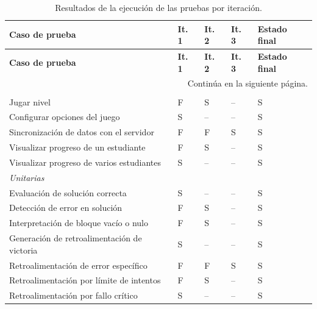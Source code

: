 \begingroup
\setlength{\tabcolsep}{4pt}
\renewcommand{\arraystretch}{1.4}
\begin{longtable}{| p{5.5cm} | >{\centering\arraybackslash}p{1cm} | >{\centering\arraybackslash}p{1cm} | >{\centering\arraybackslash}p{1cm} | >{\centering\arraybackslash}p{1.6cm} |}
	
	\caption{Resultados de la ejecución de las pruebas por iteración.}
	\label{tab:res-pruebas} \\
	
	\hline
	\small\textbf{Caso de prueba} &
	\small\textbf{It. 1} &
	\small\textbf{It. 2} &
	\small\textbf{It. 3} &
	\small\textbf{Estado final} \\
	\hline
	\endfirsthead
	
	\hline
	\small\textbf{Caso de prueba} &
	\small\textbf{It. 1} &
	\small\textbf{It. 2} &
	\small\textbf{It. 3} &
	\small\textbf{Estado final} \\
	\hline
	\endhead
	
	\hline
	\multicolumn{5}{r}{\small Continúa en la siguiente página.} \\
	\endfoot
	
	\hline
	\endlastfoot
	
	\multicolumn{5}{|l|}{\small\textit{Caja negra}} \\
	\hline
	\small Jugar nivel                                    & F & S & -- & S \\ \hline
	\small Configurar opciones del juego                  & S & -- & -- & S \\ \hline
	\small Sincronización de datos con el servidor        & F & F & S  & S \\ \hline
	\small Visualizar progreso de un estudiante           & F & S & -- & S \\ \hline
	\small Visualizar progreso de varios estudiantes      & S & -- & -- & S \\ \hline
	
	\multicolumn{5}{|l|}{\small\textit{Unitarias}} \\
	\hline
	\small Evaluación de solución correcta                & S & -- & -- & S \\ \hline
	\small Detección de error en solución                 & F & S & -- & S \\ \hline
	\small Interpretación de bloque vacío o nulo          & F & S & -- & S \\ \hline
	\small Generación de retroalimentación de victoria    & S & -- & -- & S \\ \hline
	\small Retroalimentación de error específico          & F & F & S  & S \\ \hline
	\small Retroalimentación por límite de intentos       & F & S & -- & S \\ \hline
	\small Retroalimentación por fallo crítico            & S & -- & -- & S \\ \hline
	

\end{longtable}
